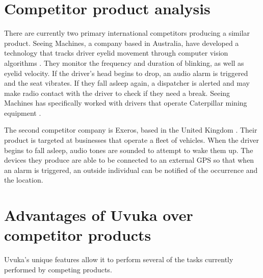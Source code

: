 \section{Competitor product analysis}
There are currently two primary international competitors producing a similar product. Seeing Machines, a company based in Australia, have developed a technology that tracks driver eyelid movement through computer vision algorithms \cite{SeeingMachinesWebsite}. They monitor the frequency and duration of blinking, as well as eyelid velocity. If the driver’s head begins to drop, an audio alarm is triggered and the seat vibrates. If they fall asleep again, a dispatcher is alerted and may make radio contact with the driver to check if they need a break. Seeing Machines has specifically worked with drivers that operate Caterpillar mining equipment \cite{SeeingMachinesWired}.

The second competitor company is Exeros, based in the United Kingdom \cite{Exeros}. Their product is targeted at businesses that operate a fleet of vehicles. When the driver begins to fall asleep, audio tones are sounded to attempt to wake them up. The devices they produce are able to be connected to an external GPS so that when an alarm is triggered, an outside individual can be notified of the occurrence and the location.



\section{Advantages of Uvuka over competitor products} 
Uvuka’s unique features allow it to perform several of the tasks currently performed by competing products.

